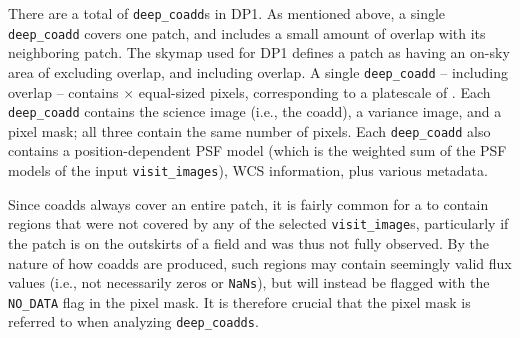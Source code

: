 \begin{itemize}
There are a total of \ndeepcoadds \texttt{deep\_coadd}s in \gls{DP1}.
As mentioned above, a single \texttt{deep\_coadd} covers one \gls{patch}, and includes a small amount of overlap with its neighboring \gls{patch}.
The skymap used for \gls{DP1} defines a \gls{patch} as having an on-sky area of \innerpatcharea excluding overlap, and \outerpatcharea including overlap. A single \texttt{deep\_coadd} -- including overlap -- contains \ndeepcoaddpixx $\times$ \ndeepcoaddpixy equal-sized pixels, corresponding to a platescale of \rawplatescale.
Each \texttt{deep\_coadd} contains the science image (i.e., the coadd), a variance image, and a pixel mask; all three contain the same number of pixels.
Each \texttt{deep\_coadd} also contains a position-dependent \gls{PSF} model (which is the weighted sum of the \gls{PSF} models of the input \texttt{visit\_images}), \gls{WCS} information, plus various \gls{metadata}.

Since coadds always cover an entire \gls{patch}, it is fairly common for a  to contain regions that were not covered by any of the selected \texttt{visit\_image}s, particularly if the \gls{patch} is on the outskirts of a field and was thus not fully observed. By the nature of how coadds are produced, such regions may contain seemingly valid \gls{flux} values (i.e., not necessarily zeros or \texttt{NaNs}), but will instead be flagged with the \texttt{NO\_DATA} flag in the pixel mask. It is therefore crucial that the pixel mask is referred to when analyzing \texttt{deep\_coadds}.



\end{itemize}
